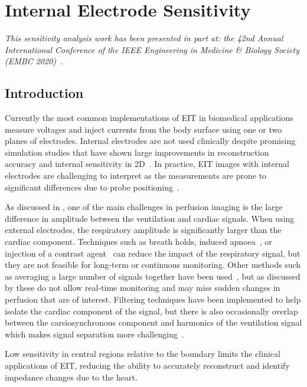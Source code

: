 \chapter{Internal Electrode Sensitivity}
\label{chap:chapter-6}
\emph{This sensitivity analysis work has
 been presented in part at: the 42nd Annual International Conference of the IEEE Engineering 
 in Medicine \& Biology Society (EMBC 2020)~\parencite{stowe_effect_2020}.} 

\section{Introduction}
Currently the most common implementations of EIT in biomedical applications
measure voltages and inject currents from the body surface using 
one or two planes of electrodes. Internal electrodes are not used clinically
despite promising simulation studies that have shown large improvements 
in reconstruction accuracy and internal sensitivity in 
2D~\parencite{nasehi_tehrani_evaluation_2012,nasehi_tehrani_modelling_2012}. 
In practice, EIT images with internal electrodes are challenging 
to interpret 
as the measurements are prone to significant differences
due to probe 
positioning~\parencite{czaplik_application_2014}. 

As discussed in , one of the main challenges 
in perfusion imaging is the large difference in amplitude 
between the ventilation and cardiac signals. 
When using external electrodes, the respiratory amplitude is 
significantly larger than the cardiac component. 
Techniques such as 
breath holds, induced apnoea~\parencite{leathard_comparison_1994,stowe_comparison_2019}, 
or injection 
of a contrast agent~\parencite{frerichs_regional_2002} can reduce the
impact of the respiratory signal, but they are not feasible for 
long-term or continuous monitoring. 
Other methods such as averaging a large number of signals together 
have been used~\parencite{eyuboglu_vivo_1989,vonk-noordegraaf_pulmonary_1998}, 
but as discussed by  
these do not allow real-time monitoring and 
may miss sudden changes in perfusion that are of interest.
Filtering techniques have been implemented to help isolate the 
cardiac component of the signal, but there is also occasionally overlap between 
the carsiosynchronous component and harmonics of the ventilation
signal which makes signal separation more 
challenging~\parencite{zadehkoochak_pulmonary_1992,leathard_comparison_1994}.


Low sensitivity in central regions relative to the boundary
limits the clinical applications of EIT, reducing the ability to
accurately reconstruct and identify impedance changes due to
the heart.

